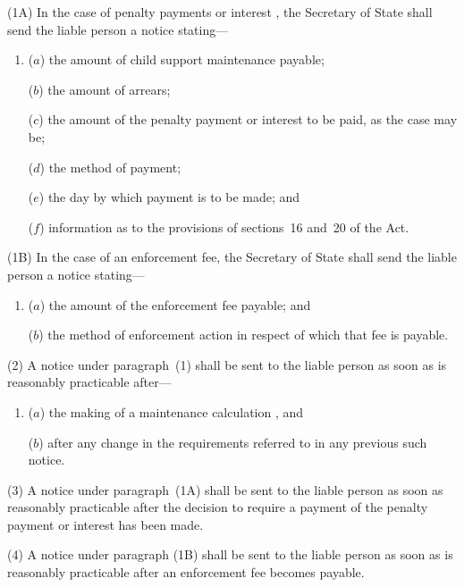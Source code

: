 \documentclass[12pt,a4paper]{article}
\begin{document}
(1A) In the case of penalty payments
or interest%
, the Secretary of State shall send the liable person a notice stating—
\begin{enumerate}\item[]
($a$) the amount of child support maintenance payable;

($b$) the amount of arrears;

($c$) the amount of the penalty payment
or interest  %
to be paid, as the case may be;

($d$) the method of payment;

($e$) the day by which payment is to be made; and

($f$) information as to the provisions of sections~16 and~20 of the Act.
\end{enumerate}

(1B) In the case of an enforcement fee, the Secretary of State shall send the liable person a notice stating—
\begin{enumerate}\item[]
($a$) the amount of the enforcement fee payable; and

($b$) the method of enforcement action in respect of which that fee is payable.
\end{enumerate}

(2) A notice under paragraph~(1) shall be sent to the liable person as soon as is reasonably practicable after—
\begin{enumerate}\item[]
($a$) the making of a maintenance 
calculation%
, and

($b$) after any change in the requirements referred to in any previous such notice.
\end{enumerate}

(3) A notice under paragraph~(1A) shall be sent to the liable person as soon as reasonably practicable after the decision to require a payment of the penalty payment
or interest  %
has been made.

(4) A notice under paragraph (1B) shall be sent to the liable person as soon as is reasonably practicable after an enforcement fee becomes payable.
\end{document}

